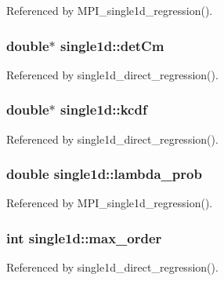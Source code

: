 Referenced by M\+P\+I\+\_\+single1d\+\_\+regression().

\subsubsection[{\texorpdfstring{det\+Cm}{detCm}}]{\setlength{\rightskip}{0pt plus 5cm}double$\ast$ single1d\+::det\+Cm}\hypertarget{structsingle1d_a4d65180611fcf02ef3820133fd49a96d}{}\label{structsingle1d_a4d65180611fcf02ef3820133fd49a96d}


Referenced by single1d\+\_\+direct\+\_\+regression().

\subsubsection[{\texorpdfstring{kcdf}{kcdf}}]{\setlength{\rightskip}{0pt plus 5cm}double$\ast$ single1d\+::kcdf}\hypertarget{structsingle1d_ad2a5bfd532c995e41650068e8b814f3e}{}\label{structsingle1d_ad2a5bfd532c995e41650068e8b814f3e}


Referenced by single1d\+\_\+direct\+\_\+regression().

\subsubsection[{\texorpdfstring{lambda\+\_\+prob}{lambda_prob}}]{\setlength{\rightskip}{0pt plus 5cm}double single1d\+::lambda\+\_\+prob}\hypertarget{structsingle1d_ad2d2fa880fec64d4278e0820934e5426}{}\label{structsingle1d_ad2d2fa880fec64d4278e0820934e5426}


Referenced by M\+P\+I\+\_\+single1d\+\_\+regression().

\subsubsection[{\texorpdfstring{max\+\_\+order}{max_order}}]{\setlength{\rightskip}{0pt plus 5cm}int single1d\+::max\+\_\+order}\hypertarget{structsingle1d_ac304ae02aa91a647f08b583df962714e}{}\label{structsingle1d_ac304ae02aa91a647f08b583df962714e}


Referenced by single1d\+\_\+direct\+\_\+regression().


